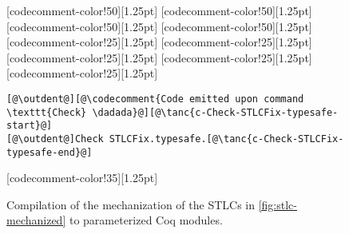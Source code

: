 \begin{figure}
\begin{minipage}{\textwidth}
\begin{multicols}{2}
[codecomment-color!50][1.25pt]
[codecomment-color!50][1.25pt]
[codecomment-color!50][1.25pt]
[codecomment-color!50][1.25pt]
[codecomment-color!25][1.25pt]
[codecomment-color!25][1.25pt]
[codecomment-color!25][1.25pt]
[codecomment-color!25][1.25pt]
[codecomment-color!25][1.25pt]

\vspace{-15pt}


\begin{lstlisting}
[@\outdent@][@\codecomment{Code emitted upon command \texttt{Check} \dadada}@][@\tanc{c-Check-STLCFix-typesafe-start}@]
[@\outdent@]Check STLCFix.typesafe.[@\tanc{c-Check-STLCFix-typesafe-end}@]
\end{lstlisting}

[codecomment-color!35][1.25pt]

\end{multicols}
\end{minipage}

\vspace{-8pt}

\caption{Compilation of the mechanization of the STLCs in \cref{fig:stlc-mechanized} to parameterized Coq modules.}
\label{fig:stlc-compiled}
\end{figure}